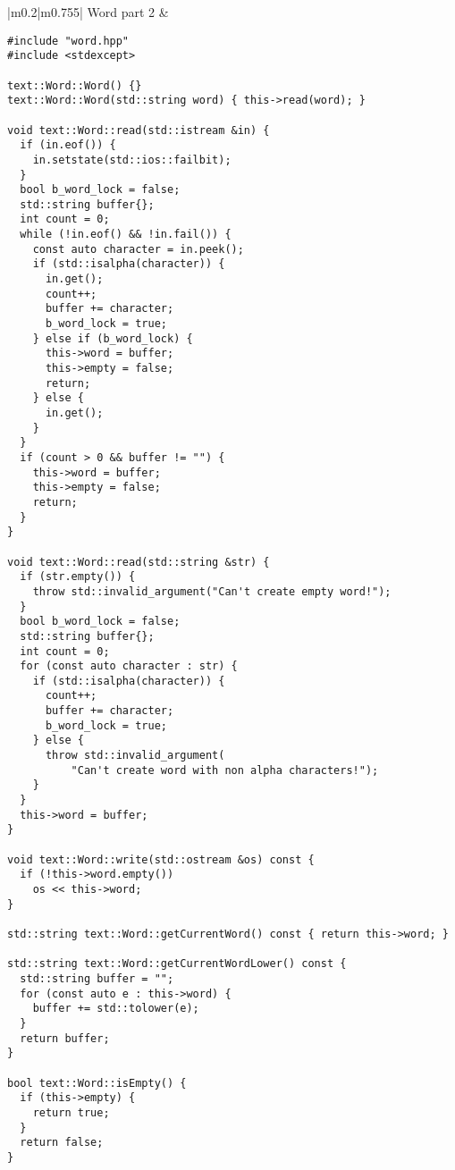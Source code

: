 \documentclass[main.tex,fontsize=8pt,paper=a4,paper=portrait,DIV=calc]{scrartcl}
\begin{document}
\begin{table}[ht!]
\begin{tabular}{|m{0.2\linewidth}|m{0.755\linewidth}|}
\hline
Word part 2 & 
\vspace{2mm}
\begin{lstlisting}
#include "word.hpp"
#include <stdexcept>

text::Word::Word() {}
text::Word::Word(std::string word) { this->read(word); }

void text::Word::read(std::istream &in) {
  if (in.eof()) {
    in.setstate(std::ios::failbit);
  }
  bool b_word_lock = false;
  std::string buffer{};
  int count = 0;
  while (!in.eof() && !in.fail()) {
    const auto character = in.peek();
    if (std::isalpha(character)) {
      in.get();
      count++;
      buffer += character;
      b_word_lock = true;
    } else if (b_word_lock) {
      this->word = buffer;
      this->empty = false;
      return;
    } else {
      in.get();
    }
  }
  if (count > 0 && buffer != "") {
    this->word = buffer;
    this->empty = false;
    return;
  }
}

void text::Word::read(std::string &str) {
  if (str.empty()) {
    throw std::invalid_argument("Can't create empty word!");
  }
  bool b_word_lock = false;
  std::string buffer{};
  int count = 0;
  for (const auto character : str) {
    if (std::isalpha(character)) {
      count++;
      buffer += character;
      b_word_lock = true;
    } else {
      throw std::invalid_argument(
          "Can't create word with non alpha characters!");
    }
  }
  this->word = buffer;
}

void text::Word::write(std::ostream &os) const {
  if (!this->word.empty())
    os << this->word;
}

std::string text::Word::getCurrentWord() const { return this->word; }

std::string text::Word::getCurrentWordLower() const {
  std::string buffer = "";
  for (const auto e : this->word) {
    buffer += std::tolower(e);
  }
  return buffer;
}

bool text::Word::isEmpty() {
  if (this->empty) {
    return true;
  }
  return false;
}
\end{lstlisting}
\\
\hline
\end{tabular}
\end{table}
\pagebreak
\end{document}
